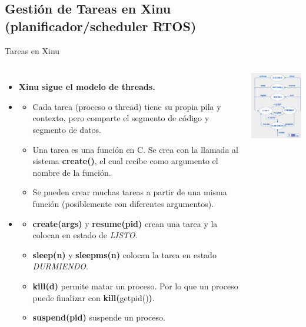 \documentclass[8pt,aspectratio=169,compress]{beamer}
\begin{document}
\subsection{Gestión de Tareas en Xinu (planificador/scheduler RTOS)}

\begin{frame}{Tareas en Xinu}


    \begin{columns}[onlytextwidth,T]
      \column{\dimexpr\linewidth-60mm-5mm}


	\begin{itemize}
\item [modelo] \textbf{Xinu sigue el modelo de threads.}
\item [tareas] 
\begin{itemize}
\item Cada tarea (proceso o thread) tiene su propia pila y contexto, pero comparte el segmento de código y segmento de datos.
\bigskip
\item Una tarea es una función en C. Se crea con la llamada al sistema \textbf{create()}, el cual recibe como argumento el nombre de la función.
\bigskip 
\item Se pueden crear muchas tareas a partir de una misma función (posiblemente con diferentes argumentos).
\end{itemize}

\item[API]

\begin{itemize}
\bigskip
\item \textbf{create(args)} y \textbf{resume(pid)} crean una tarea y la colocan en estado de \textit{LISTO}.

\bigskip
\item \textbf{sleep(n)} y \textbf{sleepms(n)} colocan la tarea en estado \textit{DURMIENDO}.

\bigskip
\item \textbf{kill(d)} permite matar un proceso. Por lo que un proceso puede finalizar con \textbf{kill(}getpid()\textbf{)}.

\bigskip
\item \textbf{suspend(pid)} suspende un proceso.
\end{itemize}
\end{itemize}

      \column{50mm}
     \includegraphics[width=50mm]{images/estados.jpg}

    \end{columns}
\end{frame}
\end{document}

